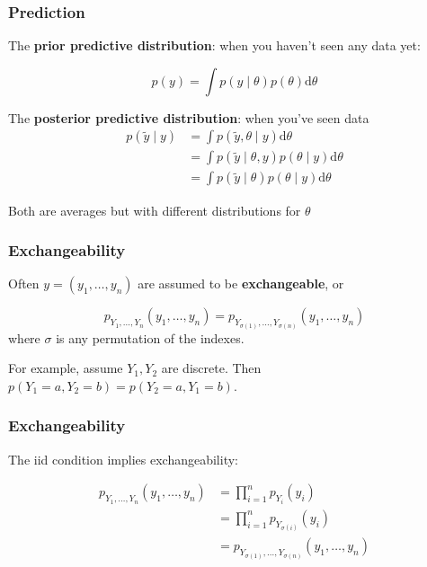 \documentclass{beamer}
\begin{document}
\begin{frame}
\frametitle{Prediction}

The {\bf prior predictive distribution}: when you haven't seen any data yet:

\[
p(y) = \int p(y \mid \theta) p(\theta) \text{d}\theta
\]
\pause

The {\bf posterior predictive distribution}: when you've seen data 
\begin{align*}
p(\tilde{y} \mid y) &= \int p(\tilde{y}, \theta \mid y) \text{d}\theta \\
&= \int p(\tilde{y} \mid \theta, y) p(\theta \mid y) \text{d}\theta \\
&= \int p(\tilde{y} \mid \theta ) p(\theta \mid y) \text{d}\theta \tag{cond. indep.}
\end{align*}

Both are averages but with different distributions for $\theta$

\end{frame}


\begin{frame}
\frametitle{Exchangeability}

Often $y = (y_1, \ldots, y_n)$ are assumed to be {\bf exchangeable}, or

\[
p_{Y_1, \ldots, Y_n}(y_1, \ldots, y_n) = p_{Y_{\sigma(1)}, \ldots, Y_{\sigma(n)} }(y_1, \ldots, y_n)
\]
where $\sigma$ is any permutation of the indexes.
\pause
\newline

For example, assume $Y_1, Y_2$ are discrete. Then $p(Y_1 = a, Y_2 = b) = p(Y_2 = a, Y_1=b)$.

\end{frame}


\begin{frame}
\frametitle{Exchangeability}

The iid condition implies exchangeability:

\begin{align*}
p_{Y_1, \ldots, Y_n}(y_1, \ldots, y_n) &= \prod_{i=1}^n p_{Y_i}(y_i) \tag{indep.} \\
&= \prod_{i=1}^n p_{Y_{\sigma(i)}}(y_i) \tag{ident.} \\
&= p_{Y_{\sigma(1)}, \ldots, Y_{\sigma(n)}}(y_1, \ldots, y_n)
\end{align*}

\end{frame}
\end{document}
